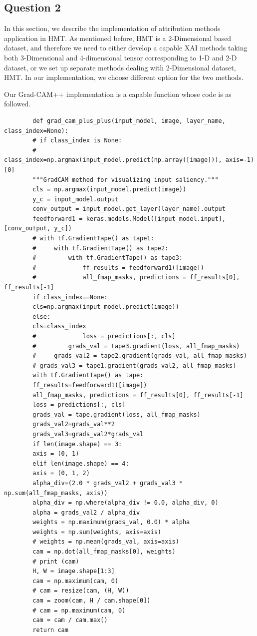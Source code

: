 \documentclass[conference]{IEEEtran}
\begin{document}
	\subsection{Question 2}
	
	In this section, we describe the implementation of attribution methods application in HMT. As mentioned before, HMT is a 2-Dimensional based dataset, and therefore we need to either develop a capable XAI methods taking both 3-Dimensional and 4-dimensional tensor corresponding to 1-D and 2-D dataset, or we set up separate methods dealing with 2-Dimensional dataset, HMT. In our implementation, we choose different option for the two methods.\par
	
	Our Grad-CAM++ implementation is a capable function whose code is as followed.
	
	\begin{lstlisting}
		def grad_cam_plus_plus(input_model, image, layer_name, class_index=None):
		# if class_index is None:
		#     class_index=np.argmax(input_model.predict(np.array([image])), axis=-1)[0]
		"""GradCAM method for visualizing input saliency."""
		cls = np.argmax(input_model.predict(image))
		y_c = input_model.output
		conv_output = input_model.get_layer(layer_name).output
		feedforward1 = keras.models.Model([input_model.input], [conv_output, y_c])
		# with tf.GradientTape() as tape1:
		#     with tf.GradientTape() as tape2:
		#         with tf.GradientTape() as tape3:
		#             ff_results = feedforward1([image])
		#             all_fmap_masks, predictions = ff_results[0], ff_results[-1]
		if class_index==None:
		cls=np.argmax(input_model.predict(image))
		else:
		cls=class_index
		#             loss = predictions[:, cls]
		#         grads_val = tape3.gradient(loss, all_fmap_masks)
		#     grads_val2 = tape2.gradient(grads_val, all_fmap_masks)
		# grads_val3 = tape1.gradient(grads_val2, all_fmap_masks)
		with tf.GradientTape() as tape:
		ff_results=feedforward1([image])
		all_fmap_masks, predictions = ff_results[0], ff_results[-1]
		loss = predictions[:, cls]
		grads_val = tape.gradient(loss, all_fmap_masks)
		grads_val2=grads_val**2
		grads_val3=grads_val2*grads_val
		if len(image.shape) == 3:
		axis = (0, 1)
		elif len(image.shape) == 4:
		axis = (0, 1, 2)
		alpha_div=(2.0 * grads_val2 + grads_val3 * np.sum(all_fmap_masks, axis))
		alpha_div = np.where(alpha_div != 0.0, alpha_div, 0)
		alpha = grads_val2 / alpha_div
		weights = np.maximum(grads_val, 0.0) * alpha
		weights = np.sum(weights, axis=axis)
		# weights = np.mean(grads_val, axis=axis)
		cam = np.dot(all_fmap_masks[0], weights)
		# print (cam)
		H, W = image.shape[1:3]
		cam = np.maximum(cam, 0)
		# cam = resize(cam, (H, W))
		cam = zoom(cam, H / cam.shape[0])
		# cam = np.maximum(cam, 0)
		cam = cam / cam.max()
		return cam
	\end{lstlisting}
	
\end{document}
